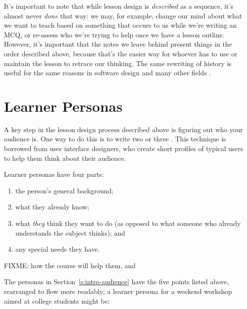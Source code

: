 It's important to note that while lesson design is \emph{described} as a
sequence, it's almost never \emph{done} that way: we may, for example,
change our mind about what we want to teach based on something that
occurs to us while we're writing an MCQ, or re-assess who we're trying
to help once we have a lesson outline. However, it's important that
the notes we leave behind present things in the order described above,
because that's the easier way for whoever has to use or maintain the
lesson to retrace our thinking. The same rewriting of history is
useful for the same reasons in software design and many other fields
\cite{Parn1986}.

\section{Learner Personas}\label{s:process-personas}

A key step in the lesson design process described above is figuring
out who your audience is. One way to do this is to write two or three
. This technique is
borrowed from user interface designers, who create short profiles of
typical users to help them think about their audience.

Learner personas have four parts:

\begin{enumerate}
\item
  the person's general background;
\item
  what they already know;
\item
  what \emph{they} think they want to do (as opposed to what someone who already
  understands the subject thinks); and
\item
  any special needs they have.
\end{enumerate}

FIXME: how the course will help them, and

The personas in Section~\ref{s:intro-audience} have the five points listed above,
rearranged to flow more readably; a learner persona for a weekend workshop aimed
at college students might be:

